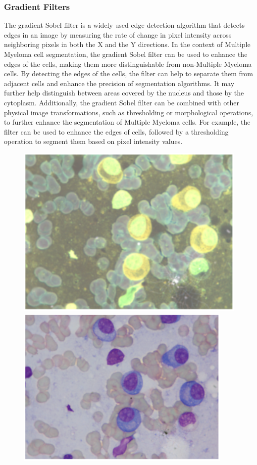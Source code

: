 \documentclass{article}
\begin{document}
\subsubsection{Gradient Filters}

The gradient Sobel filter is a widely used edge detection algorithm that detects edges in an image by measuring the rate of change in pixel intensity across neighboring pixels in both the X and the Y directions. In the context of Multiple Myeloma cell segmentation, the gradient Sobel filter can be used to enhance the edges of the cells, making them more distinguishable from non-Multiple Myeloma cells. By detecting the edges of the cells, the filter can help to separate them from adjacent cells and enhance the precision of segmentation algorithms. It may further help distinguish between areas covered by the nucleus and those by the cytoplasm. Additionally, the gradient Sobel filter can be combined with other physical image transformations, such as thresholding or morphological operations, to further enhance the segmentation of Multiple Myeloma cells. For example, the filter can be used to enhance the edges of cells, followed by a thresholding operation to segment them based on pixel intensity values.

\begin{figure}
  \centering
  \begin{minipage}{.5\textwidth}
    \centering
    \includegraphics[width=.5\linewidth]{3.png}
  \end{minipage}%
  \begin{minipage}{.4\textwidth}
    \centering
    \includegraphics[width=.63\linewidth]{4.png}
  \end{minipage}
\end{figure}
\end{document}
